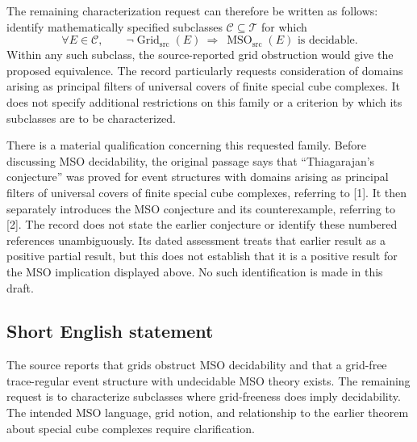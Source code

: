 \documentclass[11pt]{article}
\begin{document}
The remaining characterization request can therefore be written as follows: identify mathematically specified subclasses \(\mathcal C\subseteq\mathcal T\) for which
\[
\forall E\in\mathcal C,\qquad
\neg\operatorname{Grid}_{\mathrm{src}}(E)
\ \Longrightarrow\ 
\operatorname{MSO}_{\mathrm{src}}(E)\text{ is decidable}.
\]
Within any such subclass, the source-reported grid obstruction would give the proposed equivalence. The record particularly requests consideration of domains arising as principal filters of universal covers of finite special cube complexes. It does not specify additional restrictions on this family or a criterion by which its subclasses are to be characterized.

There is a material qualification concerning this requested family. Before discussing MSO decidability, the original passage says that ``Thiagarajan's conjecture'' was proved for event structures with domains arising as principal filters of universal covers of finite special cube complexes, referring to [1]. It then separately introduces the MSO conjecture and its counterexample, referring to [2]. The record does not state the earlier conjecture or identify these numbered references unambiguously. Its dated assessment treats that earlier result as a positive partial result, but this does not establish that it is a positive result for the MSO implication displayed above. No such identification is made in this draft.
\subsection{Short English statement}
The source reports that grids obstruct MSO decidability and that a grid-free trace-regular event structure with undecidable MSO theory exists. The remaining request is to characterize subclasses where grid-freeness does imply decidability. The intended MSO language, grid notion, and relationship to the earlier theorem about special cube complexes require clarification.
\end{document}
